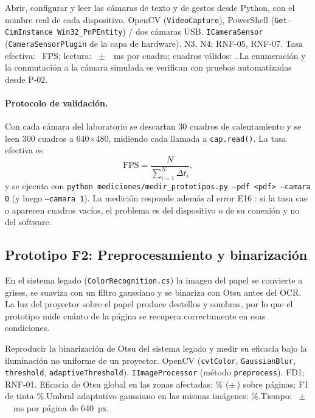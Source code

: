 {Abrir, configurar y leer las cámaras de texto y de gestos desde Python, con el nombre real de cada dispositivo.}
{OpenCV (\texttt{VideoCapture}), PowerShell (\texttt{Get-CimInstance Win32\_PnPEntity}) / dos cámaras USB.}
{\texttt{ICameraSensor} (\texttt{CameraSensorPlugin} de la capa de hardware).}
{N3, N4; RNF-05, RNF-07.}
{ \ifdefined\FUnoFps Tasa efectiva: \FUnoFps~FPS; lectura: \FUnoLecturaMs~$\pm$~\FUnoLecturaSdMs~ms por cuadro; cuadros válidos: \FUnoCuadrosValidos.\else{}.\fi\newline La enumeración y la conmutación a la cámara simulada se verifican con pruebas automatizadas desde P-02.}

\paragraph{Protocolo de validación.} Con cada cámara del laboratorio se descartan 30 cuadros de calentamiento y se leen 300 cuadros a 640$\times$480, midiendo cada llamada a \texttt{cap.read()}. La tasa efectiva es
\begin{equation}
\mathrm{FPS}=\frac{N}{\sum_{i=1}^{N}\Delta t_i},
\end{equation}
y se ejecuta con \texttt{python mediciones/medir\_prototipos.py --pdf <pdf> --camara 0} (y luego \texttt{--camara 1}). La medición responde además al error E16 \citep{ibaceta2023}: si la tasa cae o aparecen cuadros vacíos, el problema es del dispositivo o de su conexión y no del software.

\subsection{Prototipo F2: Preprocesamiento y binarización}

En el sistema legado (\texttt{ColorRecognition.cs}) la imagen del papel se convierte a grises, se suaviza con un filtro gaussiano y se binariza con Otsu antes del OCR. La luz del proyector sobre el papel produce destellos y sombras, por lo que el prototipo mide cuánto de la página se recupera correctamente en esas condiciones.

{Reproducir la binarización de Otsu del sistema legado y medir su eficacia bajo la iluminación no uniforme de un proyector.}
{OpenCV (\texttt{cvtColor}, \texttt{GaussianBlur}, \texttt{threshold}, \texttt{adaptiveThreshold}).}
{\texttt{IImageProcessor} (método \texttt{preprocess}).}
{FD1; RNF-01.}
{ Eficacia de Otsu global en las zonas afectadas: \FDosEficaciaPct\% ($\pm$\,\FDosEficaciaSd) sobre \FDosPaginas{} páginas; F1 de tinta \FDosFTintaPct\%.\newline Umbral adaptativo gaussiano en las mismas imágenes: \FDosEficaciaAdaptativoPct\%.\newline Tiempo: \FDosTiempoMs~$\pm$~\FDosTiempoSdMs~ms por página de 640~px.}

